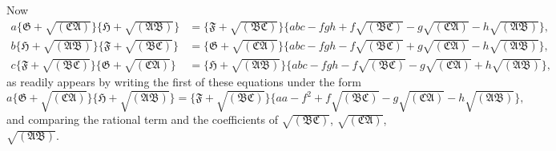 \documentclass[11pt,a4paper]{article}
\theoremstyle{definition}
\begin{document}
Now
\begin{align*}
a\{\mathfrak{G} + \sqrt{(\mathfrak{C}\mathfrak{A})}\}\{\mathfrak{H} + \sqrt{(\mathfrak{A}\mathfrak{B})}\} &= \{\mathfrak{F} + \sqrt{(\mathfrak{B}\mathfrak{C})}\}\{abc - fgh + f\sqrt{(\mathfrak{B}\mathfrak{C})} - g\sqrt{(\mathfrak{C}\mathfrak{A})} - h\sqrt{(\mathfrak{A}\mathfrak{B})}\}, \\
b\{\mathfrak{H} + \sqrt{(\mathfrak{A}\mathfrak{B})}\}\{\mathfrak{F} + \sqrt{(\mathfrak{B}\mathfrak{C})}\} &= \{\mathfrak{G} + \sqrt{(\mathfrak{C}\mathfrak{A})}\}\{abc - fgh - f\sqrt{(\mathfrak{B}\mathfrak{C})} + g\sqrt{(\mathfrak{C}\mathfrak{A})} - h\sqrt{(\mathfrak{A}\mathfrak{B})}\}, \\
c\{\mathfrak{F} + \sqrt{(\mathfrak{B}\mathfrak{C})}\}\{\mathfrak{G} + \sqrt{(\mathfrak{C}\mathfrak{A})}\} &= \{\mathfrak{H} + \sqrt{(\mathfrak{A}\mathfrak{B})}\}\{abc - fgh - f\sqrt{(\mathfrak{B}\mathfrak{C})} - g\sqrt{(\mathfrak{C}\mathfrak{A})} + h\sqrt{(\mathfrak{A}\mathfrak{B})}\},
\end{align*}
{as readily appears by writing the first of these equations under the form
\[
a\{\mathfrak{G} + \sqrt{(\mathfrak{C}\mathfrak{A})}\}\{\mathfrak{H} + \sqrt{(\mathfrak{A}\mathfrak{B})}\} = \{\mathfrak{F} + \sqrt{(\mathfrak{B}\mathfrak{C})}\}\{aa - f^{2} + f\sqrt{(\mathfrak{B}\mathfrak{C})} - g\sqrt{(\mathfrak{C}\mathfrak{A})} - h\sqrt{(\mathfrak{A}\mathfrak{B})}\},
\]
and comparing the rational term and the coefficients of $\sqrt{(\mathfrak{B}\mathfrak{C})}$, $\sqrt{(\mathfrak{C}\mathfrak{A})}$, $\sqrt{(\mathfrak{A}\mathfrak{B})}$}.

\newpage

\setcounter{page}{467}
\end{document}
